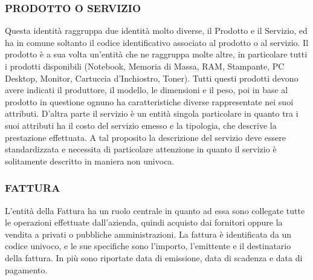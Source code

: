 \subsubsection{PRODOTTO O SERVIZIO}
Questa identità raggruppa due identità molto diverse, il Prodotto e il Servizio, ed ha in comune soltanto il codice identificativo associato al prodotto o al servizio.\newline
Il prodotto è a sua volta un'entità che ne raggruppa molte altre, in particolare tutti i prodotti disponibili (Notebook, Memoria di Massa, RAM, Stampante, PC Desktop, Monitor, Cartuccia d'Inchiostro, Toner). Tutti questi prodotti devono avere indicati il produttore, il modello, le dimensioni e il peso, poi in base al prodotto in questione ognuno ha caratteristiche diverse rappresentate nei suoi attributi.\newline
D'altra parte il servizio è un entità singola particolare in quanto tra i suoi attributi ha il costo del servizio emesso e la tipologia, che descrive la prestazione effettuata. A tal proposito la descrizione del servizio deve essere standardizzata e necessita di particolare attenzione in quanto il servizio è solitamente descritto in maniera non univoca. \newline\newline
\noindent{}

\subsubsection{FATTURA}
L'entità della Fattura ha un ruolo centrale in quanto ad essa sono collegate tutte le operazioni effettuate dall'azienda, quindi acquisto dai fornitori oppure la vendita a privati o pubbliche amministrazioni.\newline
La fattura è identificata da un codice univoco, e le sue specifiche sono l'importo, l'emittente e il destinatario della fattura. In più sono riportate data di emissione, data di scadenza e data di pagamento.\newline
\noindent{}
